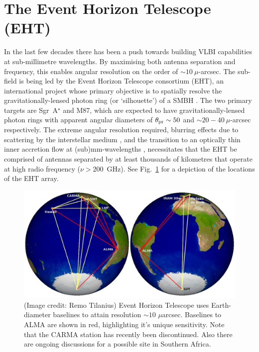 \section{The Event Horizon Telescope (EHT)}

In the last few decades there has been a push towards building VLBI capabilities at sub-millimetre wavelengths. By maximising both antenna separation and frequency, this enables angular resolution on the order of $\sim 10\ \mu$-arcsec. The sub-field is being led by the Event Horizon Telescope consortium (EHT), an international project whose primary objective is to spatially resolve the gravitationally-lensed photon ring (or `silhouette') of a SMBH \citep{Doeleman_2010}. The two primary targets are Sgr~A$^\star$ and M87, which are expected to have gravitationally-lensed photon rings with apparent angular diameters of $\theta_{\rm pr} \sim 50$ and $\sim 20-40\ \mu$-arcsec \citep*{Falcke_2013,Broderick_2009} respectively. The extreme angular resolution required, blurring effects due to scattering by the interstellar medium \citep[ISM; e.g.][]{Fish_2014}, and the transition to an optically thin inner accretion flow at (sub)mm-wavelengths \citep{Serabyn_1997,Falcke_1998}, necessitates that the EHT be comprised of antennas separated by at least thousands of kilometres that operate at high radio frequency ($\nu>200$~GHz). See Fig.~\ref{fig:eht_globe} for a depiction of the locations of the EHT array.

\begin{figure}
\begin{center}
\includegraphics[width=\columnwidth]{Images/eht_globe}
\caption{(Image credit: Remo Tilanius) Event Horizon Telescope uses Earth-diameter baselines to attain resolution $\sim 10$ $\mu$arcsec. Baselines to ALMA are shown in red, highlighting it's unique sensitivity. Note that the CARMA station has recently been discontinued. Also there are ongoing discussions for a possible site in Southern Africa.\label{fig:eht_globe}%
}
\end{center}
\end{figure}

